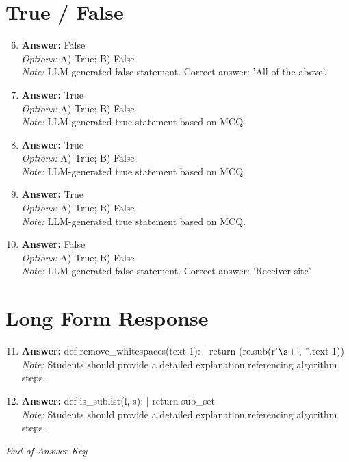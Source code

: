 \documentclass[12pt]{article}
\begin{document}
\section*{True / False}
\begin{enumerate}[label=\arabic*.]
\setcounter{enumi}{5}
\item \textbf{Answer:} False
\\ \textit{Options:} A) True; B) False
\\ \textit{Note:} LLM-generated false statement. Correct answer: 'All of the above'.
\item \textbf{Answer:} True
\\ \textit{Options:} A) True; B) False
\\ \textit{Note:} LLM-generated true statement based on MCQ.
\item \textbf{Answer:} True
\\ \textit{Options:} A) True; B) False
\\ \textit{Note:} LLM-generated true statement based on MCQ.
\item \textbf{Answer:} True
\\ \textit{Options:} A) True; B) False
\\ \textit{Note:} LLM-generated true statement based on MCQ.
\item \textbf{Answer:} False
\\ \textit{Options:} A) True; B) False
\\ \textit{Note:} LLM-generated false statement. Correct answer: 'Receiver site'.
\end{enumerate}

\section*{Long Form Response}
\begin{enumerate}[label=\arabic*.]
\setcounter{enumi}{10}
\item \textbf{Answer:} def remove\_whitespaces(text 1): | return (re.sub(r'\ensuremath{\s}+', '',text 1))
\\ \textit{Note:} Students should provide a detailed explanation referencing algorithm steps.
\item \textbf{Answer:} def is\_sublist(l, s): | return sub\_set
\\ \textit{Note:} Students should provide a detailed explanation referencing algorithm steps.
\end{enumerate}

\vfill
\noindent\textit{End of Answer Key}
\end{document}
